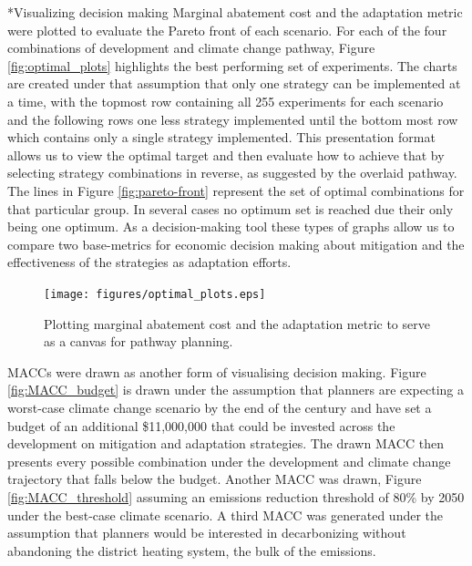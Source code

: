 \documentclass[twocolumn, a4paper,10pt]{article}
\makeatletter
\renewcommand\subsection{\@startsection{subsection}{1}{\z@}{\z@}{\z@}{\normalfont\normalsize\bfseries}}
\renewcommand\subsection{\@startsection{subsection}{1}{\z@}{\z@}{0.1pt}{\normalfont\normalsize\bfseries}}
\makeatother
\begin{document}
\subsection*{Visualizing decision making}
Marginal abatement cost and the adaptation metric were plotted to evaluate the Pareto front of each scenario. For each of the four combinations of development and climate change pathway, Figure \ref{fig:optimal_plots} highlights the best performing set of experiments. The charts are created under that assumption that only one strategy can be implemented at a time, with the topmost row containing all 255 experiments for each scenario and the following rows one less strategy implemented until the bottom most row which contains only a single strategy implemented. This presentation format allows us to view the optimal target and then evaluate how to achieve that by selecting strategy combinations in reverse, as suggested by the overlaid pathway. The lines in Figure \ref{fig:pareto-front} represent the set of optimal combinations for that particular group. In several cases no optimum set is reached due their only being one optimum. As a decision-making tool these types of graphs allow us to compare two base-metrics for economic decision making about mitigation and the effectiveness of the strategies as adaptation efforts.

\begin{figure}[hbpt]
    \centering
    \texttt{[image: figures/optimal\_plots.eps]}
    \caption{Plotting marginal abatement cost and the adaptation metric to serve as a canvas for pathway planning.}
    \label{fig:joint_plot}
\end{figure}

MACCs were drawn as another form of visualising decision making. Figure \ref{fig:MACC_budget} is drawn under the assumption that planners are expecting a worst-case climate change scenario by the end of the century and have set a budget of an additional \$11,000,000 that could be invested across the development on mitigation and adaptation strategies. The drawn MACC then presents every possible combination under the development and climate change trajectory that falls below the budget. Another MACC was drawn, Figure \ref{fig:MACC_threshold} assuming an emissions reduction threshold of 80\% by 2050 under the best-case climate scenario. A third MACC was generated under the assumption that planners would be interested in decarbonizing without abandoning the district heating system, the bulk of the emissions.
\end{document}
